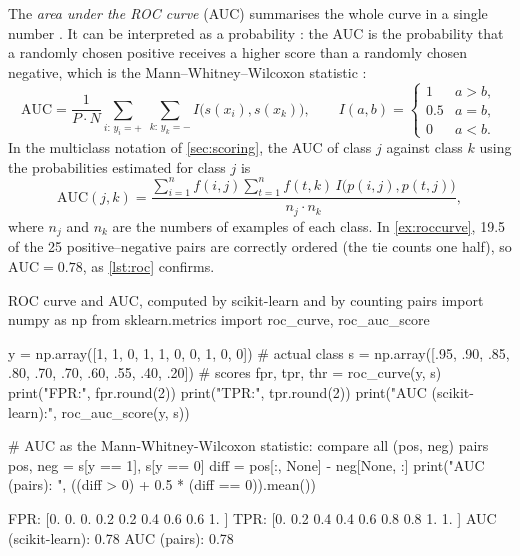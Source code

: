 The \emph{area under the ROC curve} (AUC) summarises the whole curve in a single number
\citep{bradley1997use}. It can be interpreted as a probability
\citep{hanley1982meaning}: the AUC is the probability that a randomly chosen positive
receives a higher score than a randomly chosen negative, which is the Mann--Whitney--Wilcoxon
statistic \citep{mann1947test}:
\begin{equation}\label{eq:auc}
  \mathrm{AUC}=\frac{1}{P\cdot N}\sum_{i:\,y_i=+}\ \sum_{k:\,y_k=-} I\bigl(s(x_i),s(x_k)\bigr),
  \qquad
  I(a,b)=\begin{cases}1 & a>b,\\ 0.5 & a=b,\\ 0 & a<b.\end{cases}
\end{equation}
In the multiclass notation of \cref{sec:scoring}, the AUC of class $j$ against class $k$
using the probabilities estimated for class $j$ is
\begin{equation}
  \mathrm{AUC}(j,k)=\frac{\sum_{i=1}^{n}f(i,j)\sum_{t=1}^{n}f(t,k)\,I\bigl(p(i,j),p(t,j)\bigr)}{n_j\cdot n_k},
\end{equation}
where $n_j$ and $n_k$ are the numbers of examples of each class. In \cref{ex:roccurve}, 19.5 of
the 25 positive--negative pairs are correctly ordered (the tie counts one half), so
$\mathrm{AUC}=0.78$, as \cref{lst:roc} confirms.

\begin{pylisting}[label={lst:roc}]{ROC curve and AUC, computed by scikit-learn and by counting pairs}
import numpy as np
from sklearn.metrics import roc_curve, roc_auc_score

y = np.array([1, 1, 0, 1, 1, 0, 0, 1, 0, 0])                     # actual class
s = np.array([.95, .90, .85, .80, .70, .70, .60, .55, .40, .20])  # scores
fpr, tpr, thr = roc_curve(y, s)
print("FPR:", fpr.round(2))
print("TPR:", tpr.round(2))
print("AUC (scikit-learn):", roc_auc_score(y, s))

# AUC as the Mann-Whitney-Wilcoxon statistic: compare all (pos, neg) pairs
pos, neg = s[y == 1], s[y == 0]
diff = pos[:, None] - neg[None, :]
print("AUC (pairs):       ", ((diff > 0) + 0.5 * (diff == 0)).mean())
\end{pylisting}
\begin{pyoutput}
FPR: [0.  0.  0.  0.2 0.2 0.4 0.6 0.6 1. ]
TPR: [0.  0.2 0.4 0.4 0.6 0.8 0.8 1.  1. ]
AUC (scikit-learn): 0.78
AUC (pairs):        0.78
\end{pyoutput}

